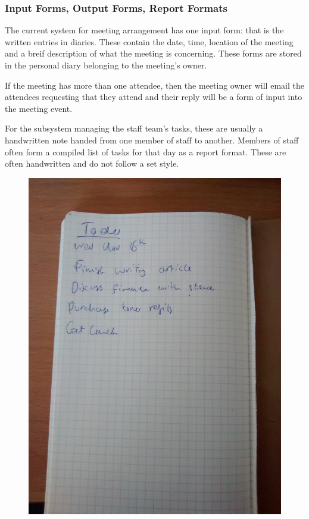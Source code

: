 \subsubsection{Input Forms, Output Forms, Report Formats}

The current system for meeting arrangement has one input form: that is the written entries in diaries. These contain the date,
 time, location of the meeting and a breif description of what the meeting is concerning. These forms are stored in the personal
 diary belonging to the meeting's owner.

If the meeting has more than one attendee, then the meeting owner will email the attendees requesting that they attend and their
 reply will be a form of input into the meeting event.

For the subsystem managing the staff team's tasks, these are usually a handwritten note handed from one member of staff to another.
 Members of staff often form a compiled list of tasks for that day as a report format. These are often handwritten and do not follow a set style.

\begin{figure}[H]
	\includegraphics[width=\textwidth]{./Analysis/diagrams/todo.jpg}
\end{figure}

